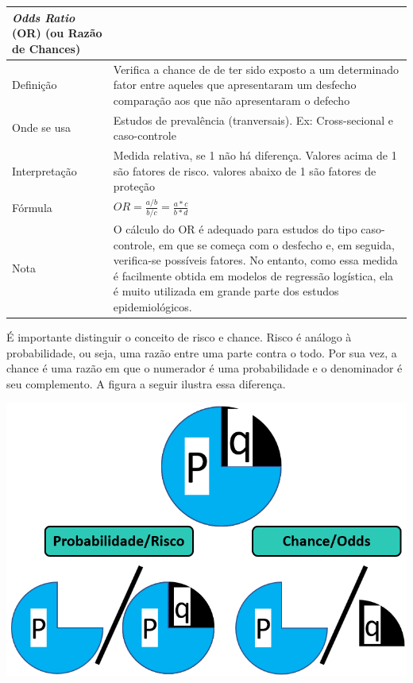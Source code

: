 \documentclass[
]{book}
\begin{document}
\begin{longtable}[]{@{}
  >{\raggedright\arraybackslash}p{}
  >{\raggedright\arraybackslash}p{}@{}}
\toprule
\emph{Odds Ratio} (OR) (ou Razão de Chances) & \\
\midrule
\endhead
Definição & Verifica a chance de de ter sido exposto a um determinado fator entre aqueles que apresentaram um desfecho comparação aos que não apresentaram o defecho \\
Onde se usa & Estudos de prevalência (tranversais). Ex: Cross-secional e caso-controle \\
Interpretação & Medida relativa, se 1 não há diferença. Valores acima de 1 são fatores de risco. valores abaixo de 1 são fatores de proteção \\
Fórmula & \(OR = \frac{a/b}{b/c}=\frac{a*c}{b*d}\) \\
Nota & O cálculo do OR é adequado para estudos do tipo caso-controle, em que se começa com o desfecho e, em seguida, verifica-se possíveis fatores. No entanto, como essa medida é facilmente obtida em modelos de regressão logística, ela é muito utilizada em grande parte dos estudos epidemiológicos. \\
\bottomrule
\end{longtable}

É importante distinguir o conceito de risco e chance. Risco é análogo à probabilidade, ou seja, uma razão entre uma parte contra o todo. Por sua vez, a chance é uma razão em que o numerador é uma probabilidade e o denominador é seu complemento. A figura a seguir ilustra essa diferença.

\includegraphics{./img/cap_reg_log_odds.png}
\end{document}
